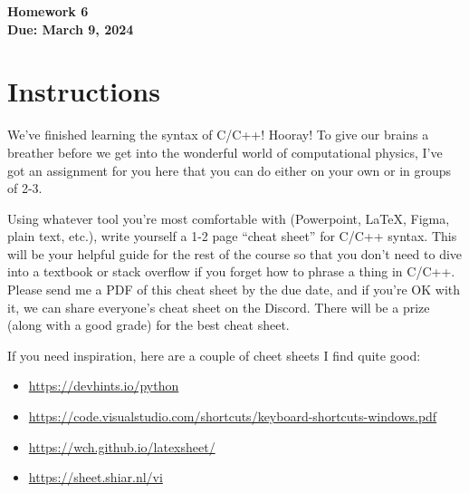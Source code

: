 \documentclass[11pt]{article}
\begin{document}
\begin{center}
\textbf{\Large Homework 6}\\
\textbf{Due: March 9, 2024}\\
\end{center}
\section*{Instructions}
We've finished learning the syntax of C/C++! Hooray! To give our brains a
breather before we get into the wonderful world of computational physics, I've
got an assignment for you here that you can do either on your own or in groups
of 2-3.

Using whatever tool you're most comfortable with (Powerpoint, LaTeX, Figma,
plain text, etc.), write yourself a 1-2 page ``cheat sheet'' for C/C++ syntax.
This will be your helpful guide for the rest of the course so that you don't
need to dive into a textbook or stack overflow if you forget how to phrase a
thing in C/C++. Please send me a PDF of this cheat sheet by the due date, and if
you're OK with it, we can share everyone's cheat sheet on the Discord.  There
will be a prize (along with a good grade) for the best cheat sheet.

If you need inspiration, here are a couple of cheet sheets I find quite good:
\begin{itemize}
    \item \url{https://devhints.io/python}
    \item \url{https://code.visualstudio.com/shortcuts/keyboard-shortcuts-windows.pdf}
    \item \url{https://wch.github.io/latexsheet/}
    \item \url{https://sheet.shiar.nl/vi}
\end{itemize}
\end{document}
